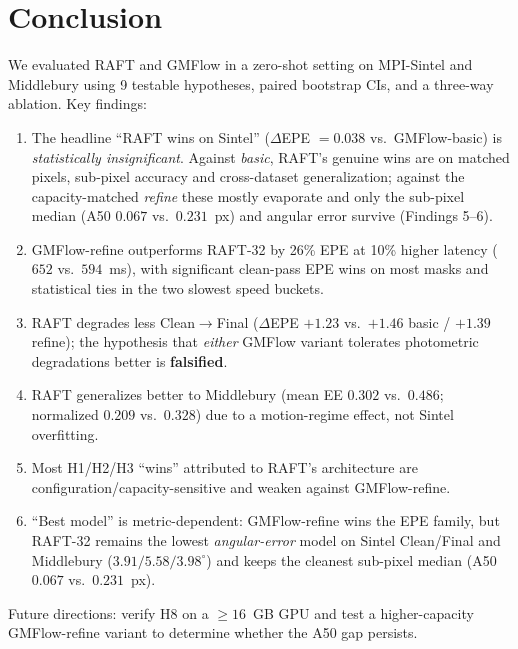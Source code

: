 \documentclass[11pt,a4paper]{article}
\let\origsection\section
\renewcommand{\section}{\FloatBarrier\origsection}
\begin{document}
\section{Conclusion}

We evaluated RAFT and GMFlow in a zero-shot setting on MPI-Sintel and
Middlebury using 9 testable hypotheses, paired bootstrap CIs, and a
three-way ablation.  Key findings:

\begin{enumerate}[leftmargin=1.5em,topsep=2pt,itemsep=2pt]
  \item The headline ``RAFT wins on Sintel'' ($\Delta$EPE $= 0.038$
    vs.\ GMFlow-basic) is \emph{statistically insignificant}.  Against
    \emph{basic}, RAFT's genuine wins are on matched pixels, sub-pixel
    accuracy and cross-dataset generalization; against the
    capacity-matched \emph{refine} these mostly evaporate and only the
    sub-pixel median (A50 $0.067$ vs.\ $0.231$~px) and angular error
    survive (Findings 5--6).
  \item GMFlow-refine outperforms RAFT-32 by 26\% EPE at 10\% higher
    latency ($652$ vs.\ $594$~ms), with significant clean-pass EPE wins
    on most masks and statistical ties in the two slowest speed buckets.
  \item RAFT degrades less Clean$\to$Final ($\Delta$EPE $+1.23$ vs.\
    $+1.46$ basic / $+1.39$ refine); the hypothesis that \emph{either}
    GMFlow variant tolerates photometric degradations better is
    \textbf{falsified}.
  \item RAFT generalizes better to Middlebury (mean EE $0.302$ vs.\
    $0.486$; normalized $0.209$ vs.\ $0.328$) due to a motion-regime
    effect, not Sintel overfitting.
  \item Most H1/H2/H3 ``wins'' attributed to RAFT's architecture are
    configuration/capacity-sensitive and weaken against GMFlow-refine.
  \item ``Best model'' is metric-dependent: GMFlow-refine wins the EPE
    family, but RAFT-32 remains the lowest \emph{angular-error} model on
    Sintel Clean/Final and Middlebury ($3.91/5.58/3.98^\circ$) and keeps
    the cleanest sub-pixel median (A50 $0.067$ vs.\ $0.231$~px).
\end{enumerate}

Future directions: verify H8 on a $\geq16$~GB GPU and test a
higher-capacity GMFlow-refine variant to determine whether the A50 gap
persists.
\end{document}

